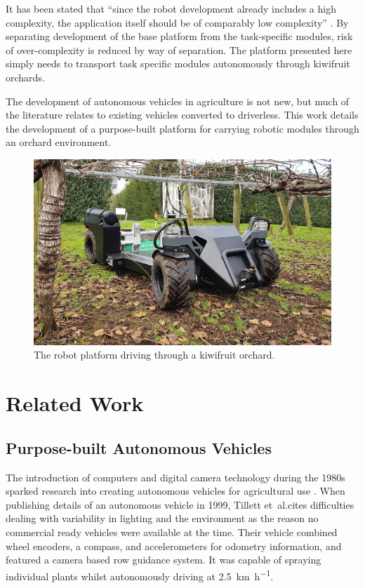 \documentclass[preprint,authoryear,12pt]{elsarticle}
\begin{document}
    It has been stated that ``since the robot development already includes a high complexity, the application itself should be of comparably low complexity'' \citep{Ruckelshausen2009}.
    By separating development of the base platform from the task-specific modules, risk of over-complexity is reduced by way of separation.
    The platform presented here simply needs to transport task specific modules autonomously through kiwifruit orchards.

    The development of autonomous vehicles in agriculture is not new, but much of the literature relates to existing vehicles converted to driverless.
    This work details the development of a purpose-built platform for carrying robotic modules through an orchard environment.

    \begin{figure}[htb]
        \centering
        \includegraphics[width=\linewidth]{imgs/photos/suzy_general.jpg}
        \caption{
            The robot platform driving through a kiwifruit orchard.
        }
        \label{fig:suzy}
    \end{figure}

\section{Related Work}
\label{sect:review}

    \subsection{Purpose-built Autonomous Vehicles}

        The introduction of computers and digital camera technology during the 1980s sparked research into creating autonomous vehicles for agricultural use \cite{Li2009}.
        When publishing details of an autonomous vehicle in 1999, Tillett et~al.\@ cites difficulties dealing with variability in lighting and the environment as the reason no commercial ready vehicles were available at the time.
        Their vehicle combined wheel encoders, a compass, and accelerometers for odometry information, and featured a camera based row guidance system.
        It was capable of spraying individual plants whilst autonomously driving at \SI{2.5}{\kilo\meter\per\hour}.
\end{document}
